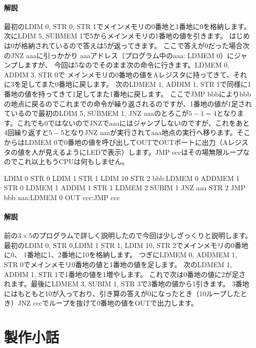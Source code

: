 \documentclass[11pt,b5paper,papersize,dvipdfmx]{jsbook}
\begin{document}
\paragraph{解説}
最初のLDIM 0, STR 0, STR 1でメインメモリの0番地と1番地に0を格納します。
次にLDIM 5, SUBMEM 1で5からメインメモリの1番地の値を引きます。
はじめは0が格納されているので答えは5が返ってきます。
ここで答えが0だった場合次のJNZ aaaに引っかかり
aaaアドレス（プログラム中のaaa: LDMEM 0）にジャンプしますが、
今回は5なのでそのまま次の命令に行きます。LDMEM 0, ADDIM 3, STR 0で
メインメモリの0番地の値をAレジスタに持ってきて、それに3を足してまた0番地に戻します。
次のLDMEM 1, ADDIM 1, STR 1で同様に1番地の値を持ってきて1足してまた1番地に戻します。
ここでJMP bbbによりbbbの地点に戻るのでこれまでの命令が繰り返されるのですが、1番地の値が1足されているので最初のLDIM 5, SUBMEM 1, JNZ aaaのとろこが$5-1=4$となります。これでも0ではないのでJNZでaaaにはジャンプしないのですが、これをあと4回繰り返すと$5-5$となりJNZ aaaが実行されてaaa地点の実行へ移ります。そこからはLDMEM 0で0番地の値を呼び出してOUTでOUTポートに出力（Aレジスタの値を人が見えるようにLEDで表示）します。JMP cccはその場無限ループなのでこれ以上もうCPUは何もしません。\par

\begin{hndcode}
    LDIM 0
    STR 0
    LDIM 1
    STR 1
    LDIM 10
    STR 2
bbb:LDMEM 0
    ADDMEM 1
    STR 0
    LDMEM 1
    ADDIM 1
    STR 1
    LDMEM 2
    SUBIM 1
    JNZ aaa
    STR 2
    JMP bbb
aaa:LDMEM 0
    OUT
ccc:JMP ccc
\end{hndcode}

\paragraph{解説}
前の$3\times5$のプログラムで詳しく説明したので今回は少しざっくりと説明します。
最初のLDIM 0, STR 0,LDIM 1 STR 1, LDIM 10, STR 2でメインメモリの0番地に0、
1番地に1、2番地に10を格納します。
つぎにLDMEM 0, ADDMEM 1, STR 0でメインメモリ0番地の値と1番地の値を足します。
次のLDMEM 1, ADDIM 1, STR 1で1番地の値を1増やします。
これで次は0番地の値に2が足されます。最後にLDMEM 3, SUBIM 1, STR 3で3番地の値から1引きます。
3番地にはもともと10が入っており、引き算の答えが0になったとき（10ループしたとき）JNZ cccでループを抜けて0番地の値をOUTで出力します。

%
\section{製作小話}
%
\end{document}
